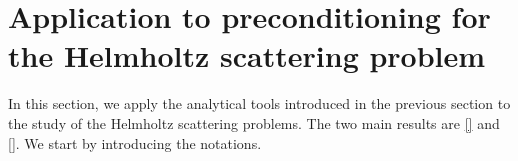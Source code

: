\documentclass[a4paper]{article}
\begin{document}


\section{Application to preconditioning for the Helmholtz scattering problem}

In this section, we apply the analytical tools introduced in the previous section to the study of the Helmholtz scattering problems. The two main results are \autoref{} and \autoref{}. We start by introducing the notations.
\end{document}
